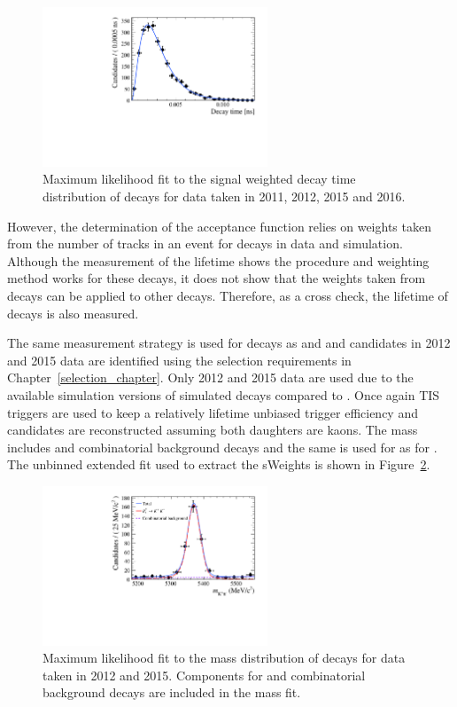 \begin{figure}[htbp]
\centering
  \includegraphics[width=0.6\textwidth]{./Figs/LifetimeSystematics/Bd2KPi_lifetime_fit.pdf}
\caption{Maximum likelihood fit to the signal weighted decay time distribution of \bdkpi decays for data taken in 2011, 2012, 2015 and 2016. }
\label{fig:bdkpilifetimefit}
\end{figure}

However, the determination of the \bsmumu acceptance function relies on weights taken from the number of tracks in an event for \bdkpi decays in data and simulation. Although the measurement of the \bdkpi lifetime shows the procedure and weighting method works for these decays, it does not show that the weights taken from \bdkpi decays can be applied to other decays. Therefore, as a cross check, the lifetime of \bskk decays is also measured. 

The same measurement strategy is used for \bskk decays as \bsmumu and \bdkpi and candidates in 2012 and 2015 data are identified using the selection requirements in Chapter~\ref{selection_chapter}. Only 2012 and 2015 data are used due to the available simulation versions of simulated \bskk decays compared to \bsmumu. Once again TIS triggers are used to keep a relatively lifetime unbiased trigger efficiency and candidates are reconstructed assuming both daughters are kaons. The mass \pdf includes \bskk and combinatorial background decays and the same \pdf is used for \bskk as for \bskpi. The unbinned extended \ml fit used to extract the sWeights is shown in Figure~\ref{fig:bskkmassfit}. 

\begin{figure}[htbp]
\centering
  \includegraphics[width=0.6\textwidth]{./Figs/LifetimeSystematics/Bs2KK_mass_fit.pdf}
\caption{Maximum likelihood fit to the mass distribution of \bskk decays for data taken in 2012 and 2015. Components for \bskk and combinatorial background decays are included in the mass fit. }
\label{fig:bskkmassfit}
\end{figure}


